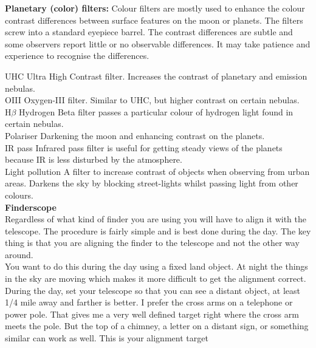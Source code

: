 \documentclass[a4paper,12pt]{extarticle}
\begin{document}
\textsf{\textbf{Planetary (color) filters:}} Colour filters are mostly used to enhance the colour contrast differences between surface features on the moon or planets. The filters screw into a standard eyepiece barrel. The contrast differences are subtle and some observers report little or no observable differences. It may take patience and experience to recognise the differences.

{\color{blue} UHC} \quad Ultra High Contrast filter. Increases the contrast of planetary and emission nebulas.\\
{\color{blue} OIII} \quad Oxygen-III filter. Similar to UHC, but higher contrast on certain nebulas.\\
{\color{blue} H$\beta$} \quad Hydrogen Beta filter passes a particular colour of hydrogen light found in certain nebulas.\\
{\color{blue} Polariser} \quad Darkening the moon and enhancing contrast on the planets.\\
{\color{blue} IR pass} \quad Infrared pass filter is useful for getting steady views of the planets because IR is less disturbed by the atmosphere.\\
{\color{blue} Light pollution} \quad A filter to increase contrast of objects when observing from
urban areas. Darkens the sky by blocking street-lights whilst passing light from other colours.\\

\textbf{Finderscope}\\

Regardless of what kind of finder you are using you will have to align it with the telescope. The procedure is fairly simple and is best done during the day. The key thing is that you are aligning the finder to the telescope and not the other way around.\\

You want to do this during the day using a fixed land object. At night the things in the sky are moving which makes it more difficult to get the alignment correct.\\

During the day, set your telescope so that you can see a distant object, at least 1/4 mile away and farther is better. I prefer the cross arms on a telephone or power pole. That gives me a very well defined target right where the cross arm meets the pole. But the top of a chimney, a letter on a distant sign, or something similar can work as well. This is your alignment target\\
\end{document}
